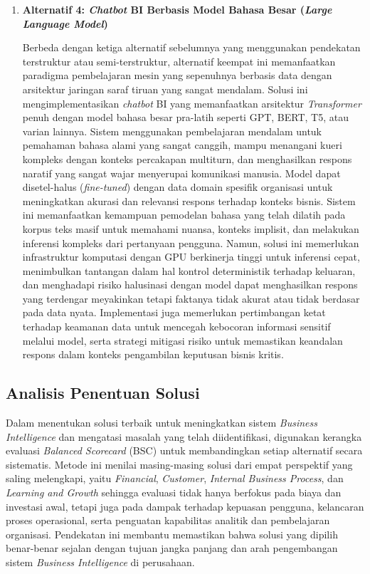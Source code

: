 \begin{enumerate}
    \item\textbf{Alternatif 4: \textit{Chatbot} BI Berbasis Model Bahasa Besar (\textit{Large Language Model})}

    Berbeda dengan ketiga alternatif sebelumnya yang menggunakan pendekatan terstruktur atau semi-terstruktur, alternatif keempat ini memanfaatkan paradigma pembelajaran mesin yang sepenuhnya berbasis data dengan arsitektur jaringan saraf tiruan yang sangat mendalam. Solusi ini mengimplementasikan \textit{chatbot} BI yang memanfaatkan arsitektur \textit{Transformer} penuh dengan model bahasa besar pra-latih seperti GPT, BERT, T5, atau varian lainnya. Sistem menggunakan pembelajaran mendalam untuk pemahaman bahasa alami yang sangat canggih, mampu menangani kueri kompleks dengan konteks percakapan multiturn, dan menghasilkan respons naratif yang sangat wajar menyerupai komunikasi manusia. Model dapat disetel-halus (\textit{fine-tuned}) dengan data domain spesifik organisasi untuk meningkatkan akurasi dan relevansi respons terhadap konteks bisnis. Sistem ini memanfaatkan kemampuan pemodelan bahasa yang telah dilatih pada korpus teks masif untuk memahami nuansa, konteks implisit, dan melakukan inferensi kompleks dari pertanyaan pengguna. Namun, solusi ini memerlukan infrastruktur komputasi dengan GPU berkinerja tinggi untuk inferensi cepat, menimbulkan tantangan dalam hal kontrol deterministik terhadap keluaran, dan menghadapi risiko halusinasi dengan model dapat menghasilkan respons yang terdengar meyakinkan tetapi faktanya tidak akurat atau tidak berdasar pada data nyata. Implementasi juga memerlukan pertimbangan ketat terhadap keamanan data untuk mencegah kebocoran informasi sensitif melalui model, serta strategi mitigasi risiko untuk memastikan keandalan respons dalam konteks pengambilan keputusan bisnis kritis.
\end{enumerate}

\subsection{Analisis Penentuan Solusi}

Dalam menentukan solusi terbaik untuk meningkatkan sistem \textit{Business Intelligence} dan mengatasi masalah yang telah diidentifikasi, digunakan kerangka evaluasi \textit{Balanced Scorecard} (BSC) untuk membandingkan setiap alternatif secara sistematis. Metode ini menilai masing-masing solusi dari empat perspektif yang saling melengkapi, yaitu \textit{Financial}, \textit{Customer}, \textit{Internal Business Process}, dan \textit{Learning and Growth} sehingga evaluasi tidak hanya berfokus pada biaya dan investasi awal, tetapi juga pada dampak terhadap kepuasan pengguna, kelancaran proses operasional, serta penguatan kapabilitas analitik dan pembelajaran organisasi. Pendekatan ini membantu memastikan bahwa solusi yang dipilih benar-benar sejalan dengan tujuan jangka panjang dan arah pengembangan sistem \textit{Business Intelligence} di perusahaan.

